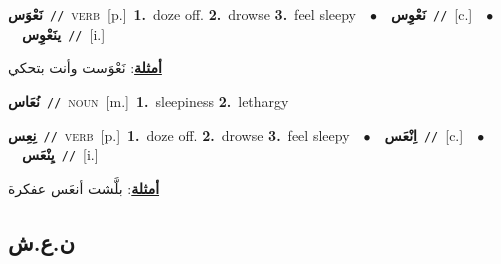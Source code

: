 \documentclass[10pt,a4paper,twoside]{article} %
\begin{document}
\begin{multicols}{2}
{\setlength\topsep{0pt}\textbf{\foreignlanguage{arabic}{نَعْوَس}}\ {\color{gray}\texttt{//}\color{black}}\ \textsc{verb}\ [p.]\ \textbf{1.}~doze off.  \textbf{2.}~drowse  \textbf{3.}~feel sleepy\ \ $\bullet$\ \ \setlength\topsep{0pt}\textbf{\foreignlanguage{arabic}{نَعْوِس}}\ {\color{gray}\texttt{//}\color{black}}\ [c.]\ \ $\bullet$\ \ \setlength\topsep{0pt}\textbf{\foreignlanguage{arabic}{ينَعْوِس}}\ {\color{gray}\texttt{//}\color{black}}\ [i.]\  \begin{flushright}\color{gray}\foreignlanguage{arabic}{\textbf{\underline{\foreignlanguage{arabic}{أمثلة}}}: نَعْوَست وأنت بتحكي}\end{flushright}\color{black}} \vspace{2mm}

{\setlength\topsep{0pt}\textbf{\foreignlanguage{arabic}{نُعَاس}}\ {\color{gray}\texttt{//}\color{black}}\ \textsc{noun}\ [m.]\ \textbf{1.}~sleepiness  \textbf{2.}~lethargy\ } \vspace{2mm}

{\setlength\topsep{0pt}\textbf{\foreignlanguage{arabic}{نِعِس}}\ {\color{gray}\texttt{//}\color{black}}\ \textsc{verb}\ [p.]\ \textbf{1.}~doze off.  \textbf{2.}~drowse  \textbf{3.}~feel sleepy\ \ $\bullet$\ \ \setlength\topsep{0pt}\textbf{\foreignlanguage{arabic}{اِنْعَس}}\ {\color{gray}\texttt{//}\color{black}}\ [c.]\ \ $\bullet$\ \ \setlength\topsep{0pt}\textbf{\foreignlanguage{arabic}{يِنْعَس}}\ {\color{gray}\texttt{//}\color{black}}\ [i.]\  \begin{flushright}\color{gray}\foreignlanguage{arabic}{\textbf{\underline{\foreignlanguage{arabic}{أمثلة}}}: بلَّشت أنعَس عفكرة}\end{flushright}\color{black}} \vspace{2mm}

\vspace{-3mm}
\subsection*{\color{blue}\foreignlanguage{arabic}{ن.ع.ش}\color{blue}{}} 


\end{multicols}
\end{document}
